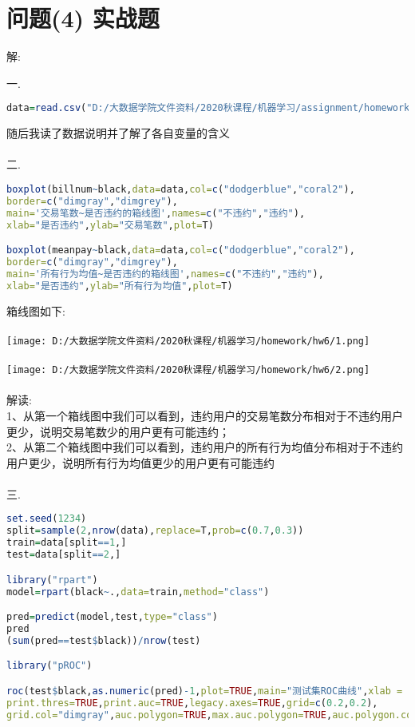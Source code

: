 \documentclass[]{article}
\begin{document}
\section{问题(4) 实战题}
\begin{flushleft}
	解:
\end{flushleft}
一.
\begin{lstlisting}[language=R]
data=read.csv("D:/大数据学院文件资料/2020秋课程/机器学习/assignment/homework6/simudata.csv")
\end{lstlisting}
随后我读了数据说明并了解了各自变量的含义\\\\
二.
\begin{lstlisting}[language=R]
boxplot(billnum~black,data=data,col=c("dodgerblue","coral2"),
border=c("dimgray","dimgrey"),
main='交易笔数~是否违约的箱线图',names=c("不违约","违约"),
xlab="是否违约",ylab="交易笔数",plot=T)

boxplot(meanpay~black,data=data,col=c("dodgerblue","coral2"),
border=c("dimgray","dimgrey"),
main='所有行为均值~是否违约的箱线图',names=c("不违约","违约"),
xlab="是否违约",ylab="所有行为均值",plot=T)
\end{lstlisting}
箱线图如下:\\\\
\texttt{[image: D:/大数据学院文件资料/2020秋课程/机器学习/homework/hw6/1.png]}\\\\
\texttt{[image: D:/大数据学院文件资料/2020秋课程/机器学习/homework/hw6/2.png]}\\\\
解读:\\
1、从第一个箱线图中我们可以看到，违约用户的交易笔数分布相对于不违约用户更少，说明交易笔数少的用户更有可能违约；\\
2、从第二个箱线图中我们可以看到，违约用户的所有行为均值分布相对于不违约用户更少，说明所有行为均值更少的用户更有可能违约\\\\
三.
\begin{lstlisting}[language=R]
set.seed(1234)
split=sample(2,nrow(data),replace=T,prob=c(0.7,0.3))
train=data[split==1,]
test=data[split==2,]

library("rpart")
model=rpart(black~.,data=train,method="class")

pred=predict(model,test,type="class")
pred
(sum(pred==test$black))/nrow(test)

library("pROC")

roc(test$black,as.numeric(pred)-1,plot=TRUE,main="测试集ROC曲线",xlab = "FPR", ylab = "TPR",
print.thres=TRUE,print.auc=TRUE,legacy.axes=TRUE,grid=c(0.2,0.2),
grid.col="dimgray",auc.polygon=TRUE,max.auc.polygon=TRUE,auc.polygon.col="darkslategray1",max.auc.polygon.col="deepskyblue")
\end{lstlisting}
\end{document}
